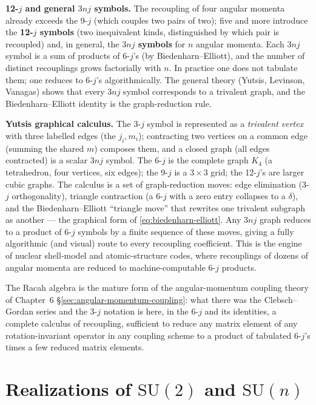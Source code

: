 \medskip\noindent\textbf{12-$j$ and general $3nj$ symbols.} The recoupling of four angular momenta already exceeds the 9-$j$ (which couples two pairs of two); five and more introduce the \textbf{12-$j$ symbols} (two inequivalent kinds, distinguished by which pair is recoupled) and, in general, the \textbf{$3nj$ symbols} for $n$ angular momenta. Each $3nj$ symbol is a sum of products of 6-$j$'s (by Biedenharn--Elliott), and the number of distinct recouplings grows factorially with $n$. In practice one does not tabulate them; one reduces to 6-$j$'s algorithmically. The general theory (Yutsis, Levinson, Vanagas) shows that every $3nj$ symbol corresponds to a trivalent graph, and the Biedenharn--Elliott identity is the graph-reduction rule.

\medskip\noindent\textbf{Yutsis graphical calculus.} The 3-$j$ symbol is represented as a \emph{trivalent vertex} with three labelled edges (the $j_{i},m_{i}$); contracting two vertices on a common edge (summing the shared $m$) composes them, and a closed graph (all edges contracted) is a scalar $3nj$ symbol. The 6-$j$ is the complete graph $K_{4}$ (a tetrahedron, four vertices, six edges); the 9-$j$ is a $3\times3$ grid; the 12-$j$'s are larger cubic graphs. The calculus is a set of graph-reduction moves: edge elimination (3-$j$ orthogonality), triangle contraction (a 6-$j$ with a zero entry collapses to a $\delta$), and the Biedenharn--Elliott ``triangle move'' that rewrites one trivalent subgraph as another --- the graphical form of \eqref{eq:biedenharn-elliott}. Any $3nj$ graph reduces to a product of 6-$j$ symbols by a finite sequence of these moves, giving a fully algorithmic (and visual) route to every recoupling coefficient. This is the engine of nuclear shell-model and atomic-structure codes, where recouplings of dozens of angular momenta are reduced to machine-computable 6-$j$ products.

The Racah algebra is the mature form of the angular-momentum coupling theory of Chapter~6 \S\ref{sec:angular-momentum-coupling}: what there was the Clebsch--Gordan series and the 3-$j$ notation is here, in the 6-$j$ and its identities, a complete calculus of recoupling, sufficient to reduce any matrix element of any rotation-invariant operator in any coupling scheme to a product of tabulated 6-$j$'s times a few reduced matrix elements.

\section{Realizations of \texorpdfstring{$\mathrm{SU}(2)$}{SU(2)} and \texorpdfstring{$\mathrm{SU}(n)$}{SU(n)}}
\label{sec:appendix-realizations}

